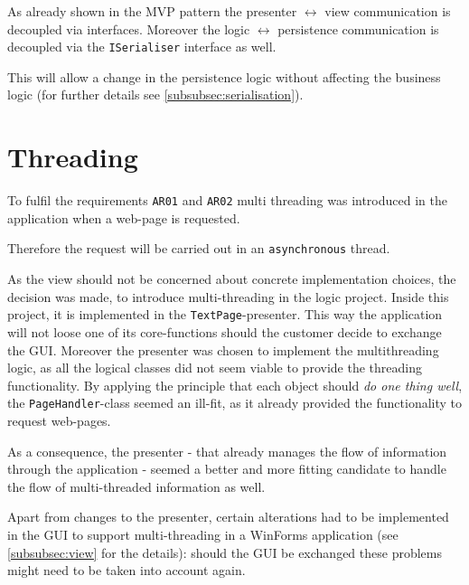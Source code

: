 As already shown in the \ac{MVP} pattern the presenter $\longleftrightarrow$ view communication is decoupled via interfaces.
Moreover the logic $\longleftrightarrow$ persistence communication is decoupled via the \texttt{ISerialiser} interface as well.

This will allow a change in the persistence logic without affecting the business logic (for further details see \autoref{subsubsec:serialisation}).

\section{Threading}
\label{subsec:threading}

To fulfil the requirements \texttt{AR01} and \texttt{AR02} multi threading was introduced in the application when a web-page is requested.

Therefore the request will be carried out in an \texttt{asynchronous} thread.

As the view should not be concerned about concrete implementation choices, the decision was made, to introduce multi-threading in the \ac{logic} project. 
Inside this project, it is implemented in the \texttt{TextPage}-presenter. 
This way the application will not loose one of its core-functions should the customer decide to exchange the \ac{GUI}.
Moreover the presenter was chosen to implement the multithreading logic, as all the logical classes did not seem viable to provide the threading functionality. 
By applying the principle that each object should \textit{do one thing well}, the \texttt{PageHandler}-class seemed an ill-fit, as it already provided the functionality to request web-pages. 

As a consequence, the presenter - that already manages the flow of information through the application - seemed a better and more fitting candidate to handle the flow of multi-threaded information as well.

Apart from changes to the presenter, certain alterations had to be implemented in the \ac{GUI} to support multi-threading in a WinForms application (see \autoref{subsubsec:view} for the details): should the \ac{GUI} be exchanged these problems might need to be taken into account again.
